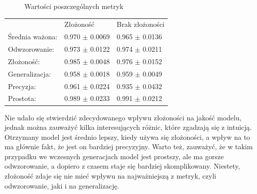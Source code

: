 \begin{figure}[H]
	\caption{\label{fig:complexity-summary}Wartości poszczególnych metryk}
\end{figure}

 \begin{center}
  \begin{tabular}{lll}
  					& Złożoność & Brak złożoności \\
	Średnia ważona: & 0.970 $\pm$ 0.0069 & 0.965 $\pm$ 0.0136 \\ 
	Odwzorowanie: & 0.973 $\pm$ 0.0122 & 0.974 $\pm$ 0.0211 \\
	Złożoność: & 0.985 $\pm$ 0.0048 & 0.976 $\pm$ 0.0152 \\
	Generalizacja: & 0.958 $\pm$ 0.0018 & 0.959 $\pm$ 0.0049 \\
	Precyzja: & 0.961 $\pm$ 0.0224 & 0.935 $\pm$ 0.0432 \\
	Prostota: & 0.989 $\pm$ 0.0233 & 0.991 $\pm$ 0.0212
  \end{tabular}
 \end{center}

Nie udało się stwierdzić zdecydowanego wpływu złożoności na jakość modelu, jednak można zauważyć kilka interesujących różnic, które zgadzają się z intuicją. Otrzymany model jest średnio lepszy, kiedy używa się złożoności, a wpływ na to ma głównie fakt, że jest on bardziej precyzyjny. Warto też, zauważyć, że w takim przypadku we wczesnych generacjach model jest prostszy, ale ma gorsze odwzorowanie, a dopiero z czasem staje się bardziej skomplikowany. Niestety, złożoność zdaje się nie mieć wpływu na najważniejszą z metryk, czyli odwzorowanie, jaki i na generalizację. 

